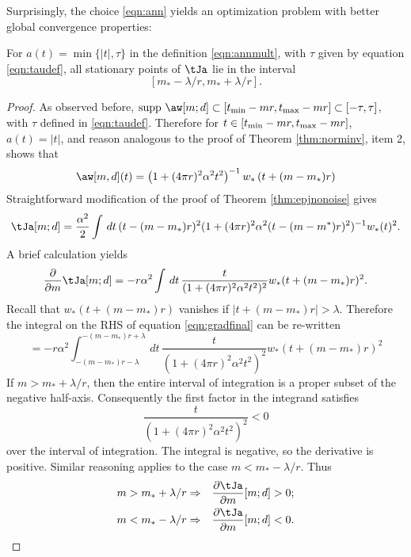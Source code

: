Surprisingly, the choice \ref{eqn:ann} yields an optimization
problem with better global convergence properties:

\begin{theorem}
  \label{thm:rampgood}
  For $a(t)=\min\{|t|,\tau\}$ in the definition \ref{eqn:annmult},
  with $\tau$ given by equation \ref{eqn:taudef}, all
  stationary points of $\tJa$ lie in the interval
  \[
    [m_*-\lambda/r, m_*+\lambda/r].
  \]
\end{theorem}
\begin{proof}
  As observed before, $\mbox{supp }\aw[m;d] \subset [t_{\rm
    min}-mr,t_{\rm max}-mr]\subset [-\tau,\tau]$, with $\tau$ defined
  in \ref{eqn:taudef}. Therefore for $t \in  [t_{\rm min}-mr,t_{\rm
    max}-mr]$, $a(t) = |t|$, and reason analogous to the proof of
  Theorem \ref{thm:norminv}, item 2, shows that
  \begin{equation}
    \label{eqn:solnnon}
    \aw[m,d](t)= \left(1+ (4\pi r)^2\alpha^2 t^2\right)^{-1}w_*\left(t+(m-m_*)r\right) 
  \end{equation}
  Straightforward modification of the proof of Theorem
  \ref{thm:epjnonoise} gives
  \begin{equation}
    \label{eqn:expj}
    \tJa[m;d] =\frac{\alpha^2}{2}\int\,dt\,(t-(m-m_*)r)^2(1+(4\pi r)^2 \alpha^2 
    (t-(m-m^*)r)^2)^{-1}w_*(t)^2.
  \end{equation}
  A brief calculation yields
  \begin{equation}
    \label{eqn:gradfinal}
    \frac{\partial}{\partial m}\tJa[m;d] = -r\alpha^2\int \,dt\,\frac{t}{(1+(4\pi r)^2\alpha^2 t^2)^2}w_*(t+(m-m_*)r)^2.
  \end{equation}
  Recall that $w_*(t+(m-m_*)r)$
  vanishes if $|t+(m-m_*)r| > \lambda$. Therefore the integral on the
  RHS of equation \ref{eqn:gradfinal} can be re-written
  \[
    = -r\alpha^2\int_{-(m-m_*)r-\lambda}^{-(m-m_*)r+\lambda}
    \,dt\, \frac{t}{(1+(4\pi r)^2\alpha^2 t^2)^2}w_*\left(t+(m-m_*)r\right)^2
  \]
  If $m > m_*+\lambda/r$, then the entire interval of integration is a proper
  subset of the negative half-axis. Consequently the first factor in the
  integrand satisfies
  \[
    \frac{t}{(1+(4\pi r)^2\alpha^2 t^2)^2}< 0
  \]
  over the interval of integration. The integral is
  negative, so the derivative
  is positive. Similar reasoning applies to the case $m <
  m_*-\lambda/r$. Thus
  \begin{eqnarray}
    m > m_*+\lambda/r & \Rightarrow & \frac{\partial \tJa}{\partial
                                      m}[m;d]> 0; \nonumber\\
    m < m_*-\lambda/r & \Rightarrow & \frac{\partial \tJa}{\partial
                                      m}[m;d]< 0.
                                      \label{eqn:leftright}
  \end{eqnarray}
\end{proof}

